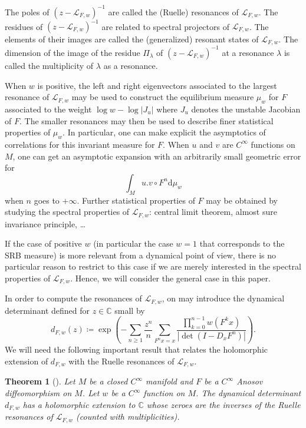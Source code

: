 \documentclass[10pt]{amsart}
\newtheorem{theo}{Theorem}[section]
\theoremstyle{definition}\newtheorem{defi}[theo]{Definition}\newtheorem{rema}[theo]{Remark}\newtheorem{exam}[theo]{Example}\newtheorem{exem}[theo]{Example}\newtheorem{nota}[theo]{Notation}
\newcommand{\p}[1]{\left(#1\right)}
\newcommand{\va}[1]{\left|#1\right|}
\newcommand{\clL}{\mathcal{L}}
\newcommand{\bbC}{\mathbb{C}}
\newcommand{\rmd}{\mathrm{d}}
\begin{document}
The poles of $(z - \clL_{F,w})^{-1}$ are called the (Ruelle) resonances of $\clL_{F,w}$. The residues of $(z - \clL_{F,w})^{-1}$ are related to spectral projectors of $\clL_{F,w}$. The elements of their images are called the (generalized) resonant states of $\clL_{F,w}$. The dimension of the image of the residue $\Pi_\lambda$ of $(z - \clL_{F,w})^{-1}$ at a resonance $\lambda$ is called the multiplicity of $\lambda$ as a resonance.

When $w$ is positive, the left and right eigenvectors associated to the largest resonance of $\clL_{F,w}$ may be used to construct the equilibrium measure $\mu_w$ for $F$ associated to the weight $\log w - \log |J_u|$ where $J_u$ denotes the unstable Jacobian of $F$. The smaller resonances may then be used to describe finer statistical properties of $\mu_w$. In particular, one can make explicit the asymptotics of correlations for this invariant measure for $F$. When $u$ and $v$ are $C^\infty$ functions on $M$, one can get an asymptotic expansion with an arbitrarily small geometric error for
\begin{equation*}
\int_M u. v \circ F^n \rmd \mu_w
\end{equation*}
when $n$ goes to $+ \infty$. Further statistical properties of $F$ may be obtained by studying the spectral properties of $\clL_{F,w}$: central limit theorem, almost sure invariance principle, \dots

If the case of positive $w$ (in particular the case $w = 1$ that corresponds to the SRB measure) is more relevant from a dynamical point of view, there is no particular reason to restrict to this case if we are merely interested in the spectral properties of $\clL_{F,w}$. Hence, we will consider the general case in this paper.

In order to compute the resonances of $\clL_{F,w}$, on may introduce the dynamical determinant defined for $z \in \bbC$ small by
\begin{equation}\label{eq:dynamical_determinant}
d_{F,w}(z) \coloneqq \exp\p{ - \sum_{n\geq1} \frac{z^n}{n} \sum_{F^n x = x} \frac{\prod_{k = 0}^{n-1} w\left(F^k x\right)}{\va{\det\p{ I - D_x F^n}}}}.
\end{equation}
We will need the following important result that relates the holomorphic extension of $d_{F,w}$ with the Ruelle resonances of $\clL_{F,w}$.

\begin{theo}[\cite{baladi_tsujii_determinant, kitaev_corrigendum,kitaev,liverani_tsujii}]\label{theorem:determinant}
Let $M$ be a closed $C^\infty$ manifold and $F$ be a $C^\infty$ Anosov diffeomorphism on $M$. Let $w$ be a $C^\infty$ function on $M$. The dynamical determinant $d_{F,w}$ has a holomorphic extension to $\bbC$ whose zeroes are the inverses of the Ruelle resonances of $\clL_{F,w}$ (counted with multiplicities).
\end{theo}
\end{document}

